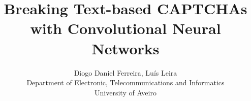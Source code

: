 \documentclass[journal]{IEEEtran}
\begin{document}
%
\title{Breaking Text-based CAPTCHAs with Convolutional Neural Networks}
%
%
%

\author{ Diogo Daniel Ferreira, Luís Leira \\
Department of Electronic, Telecommunications and Informatics \\
University of Aveiro}


% 
%
\end{document}
